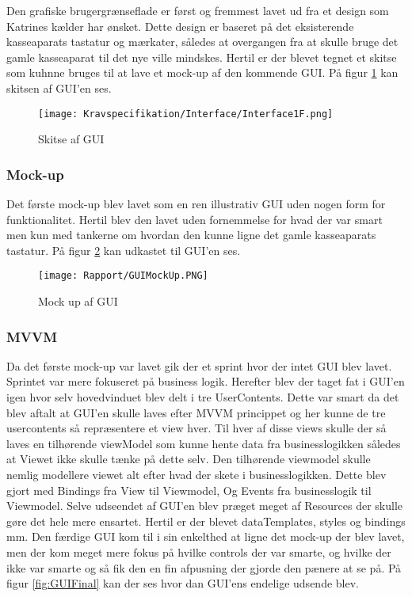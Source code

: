 Den grafiske brugergrænseflade er først og fremmest lavet ud fra et design som Katrines kælder
har ønsket. Dette design er baseret på det eksisterende kasseaparats tastatur og mærkater, således
at overgangen fra at skulle bruge det gamle kasseaparat til det nye ville mindskes.
Hertil er der blevet tegnet et skitse som kuhnne bruges til at lave et mock-up af den kommende GUI. På figur \ref{fig:GUTskitse} kan skitsen af GUI'en ses.\newline

\begin{figure}[H]
\centering
	\texttt{[image: Kravspecifikation/Interface/Interface1F.png]}
	\caption{Skitse af GUI}
	\label{fig:GUTskitse}
\end{figure}

\subsubsection{Mock-up}
Det første mock-up blev lavet som en ren illustrativ GUI uden nogen form for funktionalitet. Hertil
blev den lavet uden fornemmelse for hvad der var smart men kun med tankerne om hvordan den
kunne ligne det gamle kasseaparats tastatur. På figur \ref{fig:GUIMock} kan udkastet til GUI'en ses.
\begin{figure}[H]
\centering
	\texttt{[image: Rapport/GUIMockUp.PNG]}
	\caption{Mock up af GUI}
	\label{fig:GUIMock}
\end{figure}
\subsubsection{MVVM}
Da det første mock-up var lavet gik der et sprint hvor der intet GUI blev lavet. Sprintet var mere fokuseret på business logik. Herefter blev der taget fat i GUI’en igen hvor selv hovedvinduet blev delt i tre
UserContents. Dette var smart da det blev aftalt at GUI’en skulle laves efter MVVM princippet
og her kunne de tre usercontents så repræsentere et view hver. Til hver af disse views skulle der så
laves en tilhørende viewModel som kunne hente data fra businesslogikken således at Viewet ikke
skulle tænke på dette selv. Den tilhørende viewmodel skulle nemlig modellere viewet alt efter hvad
der skete i businesslogikken. Dette blev gjort med Bindings fra View til Viewmodel, Og Events fra
businesslogik til Viewmodel.
Selve udseendet af GUI’en blev præget meget af Resources der skulle gøre det hele mere ensartet.
Hertil er der blevet dataTemplates, styles og bindings mm.
Den færdige GUI kom til i sin enkelthed at ligne det mock-up der blev lavet, men der kom meget
mere fokus på hvilke controls der var smarte, og hvilke der ikke var smarte og så fik den en fin
afpusning der gjorde den pænere at se på. På figur \ref{fig:GUIFinal} kan der ses hvor dan GUI'ens endelige udsende blev.

